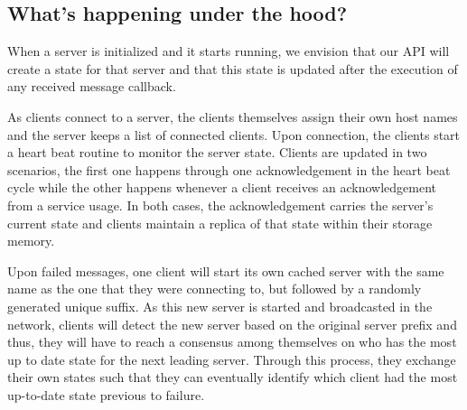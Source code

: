 \subsection{What's happening under the hood?}

When a server is initialized and it starts running, we envision that our API will create a state for that server and that this state is updated after the execution of any received message callback. 

As clients connect to a server, the clients themselves assign their own host names and the server keeps a list of connected clients. Upon connection, the clients start a heart beat routine to monitor the server state. Clients are updated in two scenarios, the first one happens through one acknowledgement in the heart beat cycle while the other happens whenever a client receives an acknowledgement from a service usage. In both cases, the acknowledgement carries the server's current state and clients maintain a replica of that state within their storage memory.

Upon failed messages, one client will start its own cached server with the same name as the one that they were connecting to, but followed by a randomly generated unique suffix. As this new server is started and broadcasted in the network, clients will detect the new server based on the original server prefix and thus, they will have to reach a consensus among themselves on who has the most up to date state for the next leading server. Through this process, they exchange their own states such that they can eventually identify which client had the most up-to-date state previous to failure.

